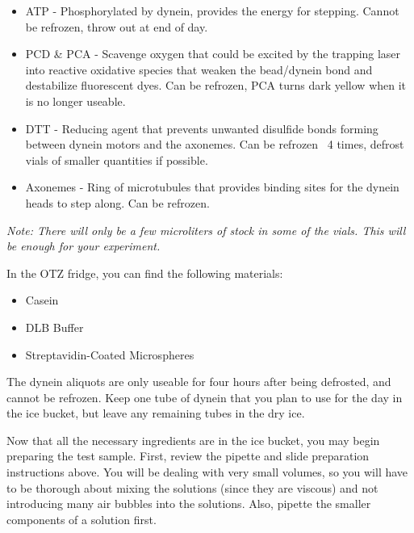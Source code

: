 \documentclass{../lab}
\begin{document}
\begin{itemize}
    \item ATP - Phosphorylated by dynein, provides the energy for stepping. Cannot be refrozen, throw out at end of day.

    \item PCD \& PCA - Scavenge oxygen that could be excited by the trapping laser into reactive oxidative species that weaken the bead/dynein bond and destabilize fluorescent dyes. Can be refrozen, PCA turns dark yellow when it is no longer useable.

    \item DTT - Reducing agent that prevents unwanted disulfide bonds forming between dynein motors and the axonemes. Can be refrozen ~4 times, defrost vials of smaller quantities if possible.

    \item Axonemes - Ring of microtubules that provides binding sites for the dynein heads to step along. Can be refrozen.

\end{itemize}

\emph{Note: There will only be a few microliters of stock in some of the vials. This will be enough for your experiment.}

In the OTZ fridge, you can find the following materials:

\begin{itemize}
    \item Casein

    \item DLB Buffer

    \item Streptavidin-Coated Microspheres

\end{itemize}

The dynein aliquots are only useable for four hours after being defrosted, and cannot be refrozen. Keep one tube of dynein that you plan to use for the day in the ice bucket, but leave any remaining tubes in the dry ice.

Now that all the necessary ingredients are in the ice bucket, you may begin preparing the test sample. First, review the pipette and slide preparation instructions above. You will be dealing with very small volumes, so you will have to be thorough about mixing the solutions (since they are viscous) and not introducing many air bubbles into the solutions. Also, pipette the smaller components of a solution first.
\end{document}
